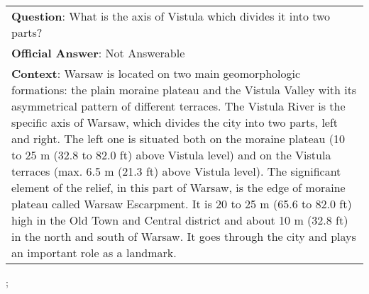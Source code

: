 \begin{figure*}[ht]
{\begin{tabular}{p{}}
            \textbf{Question}: What is the axis of Vistula which divides it into two parts?                                                                                                                                                                                                                                                                                                                                                                                                                                                                                                                                                                                                                                                                                                                               \\
            \textbf{Official Answer}: Not Answerable                                                                                                                                                                                                                                                                                                                                                                                                                                                                                                                                                                                                                                                                                                                                                                      \\
            \textbf{Context}: Warsaw is located on two main geomorphologic formations: the plain moraine plateau and the Vistula Valley with its asymmetrical pattern of different terraces. The Vistula River is the specific axis of Warsaw, which divides the city into two parts, left and right. The left one is situated both on the moraine plateau (10 to 25 m (32.8 to 82.0 ft) above Vistula level) and on the Vistula terraces (max. 6.5 m (21.3 ft) above Vistula level). The significant element of the relief, in this part of Warsaw, is the edge of moraine plateau called Warsaw Escarpment. It is 20 to 25 m (65.6 to 82.0 ft) high in the Old Town and Central district and about 10 m (32.8 ft) in the north and south of Warsaw. It goes through the city and plays an important role as a landmark. \\
        \end{tabular}
    };
    \label{fig:ex-5ad4d2855b96ef001a10a1dc}
\end{figure*}

